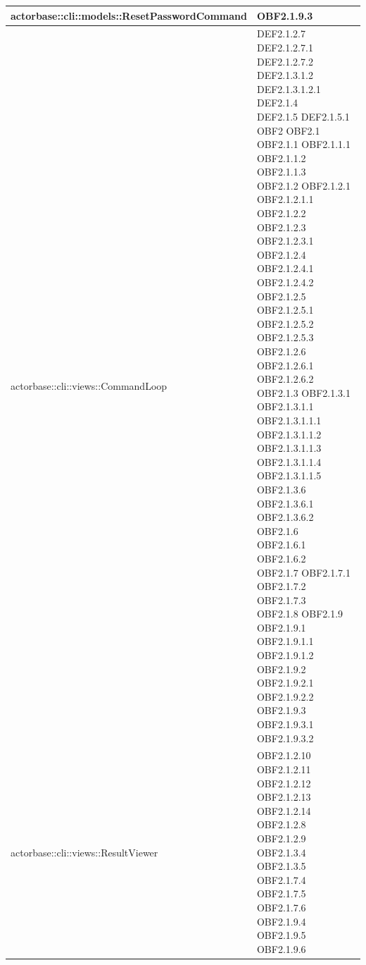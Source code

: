 \documentclass{scalatekids-article}
\begin{document}
\begin{longtable}[H]{|p{12cm}|p{5.5cm}|}
  \hline
  actorbase::cli::models::ResetPasswordCommand & \multiLineCell[t]{OBF2.1.9.3\\}\\
  \hline
  actorbase::cli::views::CommandLoop & \multiLineCell[t]{DEF2.1.2.7 DEF2.1.2.7.1\\DEF2.1.2.7.2 DEF2.1.3.1.2\\DEF2.1.3.1.2.1 DEF2.1.4\\DEF2.1.5 DEF2.1.5.1\\OBF2 OBF2.1\\OBF2.1.1 OBF2.1.1.1\\OBF2.1.1.2 OBF2.1.1.3\\OBF2.1.2 OBF2.1.2.1\\OBF2.1.2.1.1 OBF2.1.2.2\\OBF2.1.2.3 OBF2.1.2.3.1\\OBF2.1.2.4 OBF2.1.2.4.1\\OBF2.1.2.4.2 OBF2.1.2.5\\OBF2.1.2.5.1 OBF2.1.2.5.2\\OBF2.1.2.5.3 OBF2.1.2.6\\OBF2.1.2.6.1 OBF2.1.2.6.2\\OBF2.1.3 OBF2.1.3.1\\OBF2.1.3.1.1 OBF2.1.3.1.1.1\\OBF2.1.3.1.1.2 OBF2.1.3.1.1.3\\OBF2.1.3.1.1.4 OBF2.1.3.1.1.5\\OBF2.1.3.6 OBF2.1.3.6.1\\OBF2.1.3.6.2 OBF2.1.6\\OBF2.1.6.1 OBF2.1.6.2\\OBF2.1.7 OBF2.1.7.1\\OBF2.1.7.2 OBF2.1.7.3\\OBF2.1.8 OBF2.1.9\\OBF2.1.9.1 OBF2.1.9.1.1\\OBF2.1.9.1.2 OBF2.1.9.2\\OBF2.1.9.2.1 OBF2.1.9.2.2\\OBF2.1.9.3 OBF2.1.9.3.1\\OBF2.1.9.3.2}\\
  \hline
  actorbase::cli::views::ResultViewer & \multiLineCell[t]{OBF2.1.2.10 OBF2.1.2.11\\OBF2.1.2.12 OBF2.1.2.13\\OBF2.1.2.14 OBF2.1.2.8\\OBF2.1.2.9 OBF2.1.3.4\\OBF2.1.3.5 OBF2.1.7.4\\OBF2.1.7.5 OBF2.1.7.6\\OBF2.1.9.4 OBF2.1.9.5\\OBF2.1.9.6}\\

\end{longtable}
\end{document}
